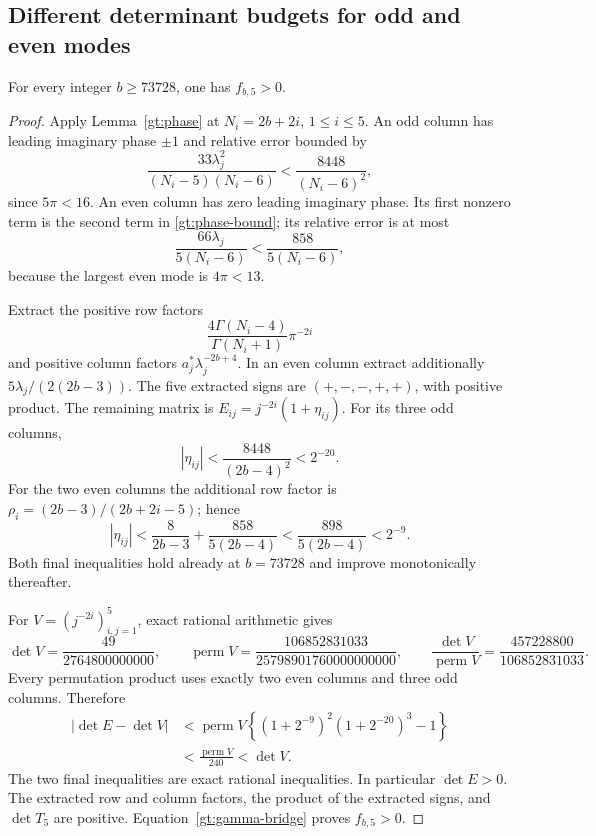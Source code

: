 \subsection{Different determinant budgets for odd and even modes}

\begin{proposition}
\label{gt:positive-tail}
For every integer $b\ge73728$, one has $f_{b,5}>0$.
\end{proposition}

\begin{proof}
Apply Lemma~\ref{gt:phase} at $N_i=2b+2i$, $1\le i\le5$.
An odd column has leading imaginary phase $\pm1$ and relative
error bounded by
\[
 \frac{33\lambda_j^2}{(N_i-5)(N_i-6)}
                       <\frac{8448}{(N_i-6)^2},
\]
since $5\pi<16$. An even column has zero leading imaginary phase.
Its first nonzero term is the second term in
\eqref{gt:phase-bound}; its relative error is at most
\[
 \frac{66\lambda_j}{5(N_i-6)}
                       <\frac{858}{5(N_i-6)},
\]
because the largest even mode is $4\pi<13$.

Extract the positive row factors
\[
             \frac{4\Gamma(N_i-4)}{\Gamma(N_i+1)}\pi^{-2i}
\]
and positive column factors $a_j^*\lambda_j^{-2b+4}$.
In an even column extract additionally
$5\lambda_j/(2(2b-3))$. The five extracted signs are
$(+,-,-,+,+)$, with positive product. The remaining matrix is
$E_{ij}=j^{-2i}(1+\eta_{ij})$.
For its three odd columns,
\[
 |\eta_{ij}|<\frac{8448}{(2b-4)^2}<2^{-20}.
\]
For the two even columns the additional row factor is
$\rho_i=(2b-3)/(2b+2i-5)$; hence
\[
 |\eta_{ij}|
 <\frac8{2b-3}+\frac{858}{5(2b-4)}
 <\frac{898}{5(2b-4)}<2^{-9}.
\]
Both final inequalities hold already at $b=73728$ and improve
monotonically thereafter.

For $V=(j^{-2i})_{i,j=1}^{5}$, exact rational arithmetic gives
\begin{equation}\label{gt:V}
 \det V=\frac{49}{2764800000000},\qquad
 \operatorname{perm}V=\frac{106852831033}{25798901760000000000},
 \qquad
 \frac{\det V}{\operatorname{perm}V}
       =\frac{457228800}{106852831033}.
\end{equation}
Every permutation product uses exactly two even columns and three
odd columns. Therefore
\begin{align*}
 |\det E-\det V|
 &<\operatorname{perm}V
       \left\{(1+2^{-9})^2(1+2^{-20})^3-1\right\}\\
 &<\frac{\operatorname{perm}V}{240}<\det V.
\end{align*}
The two final inequalities are exact rational inequalities.
In particular $\det E>0$. The extracted row and column factors,
the product of the extracted signs, and $\det T_5$ are positive.
Equation~\eqref{gt:gamma-bridge} proves $f_{b,5}>0$.
\end{proof}

